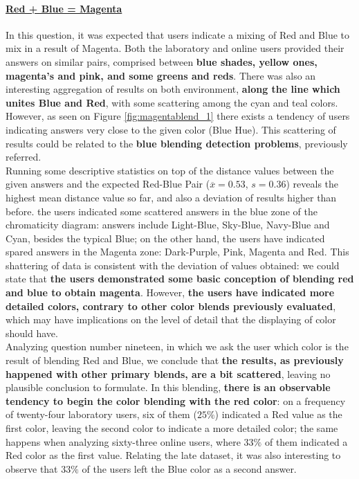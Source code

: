 \paragraph{\ul{Red + Blue = Magenta}}
%
In this question, it was expected that users indicate a mixing of Red and Blue to mix in a result of Magenta. Both the laboratory and online users provided their answers on similar pairs, comprised between \textbf{blue shades, yellow ones, magenta's and
pink, and some greens and reds}. There was also an interesting aggregation of results on both environment, \textbf{along the line which unites Blue and Red}, with some scattering among the cyan and teal colors.  \\
However, as seen on Figure \ref{fig:magentablend_1} there exists a tendency of users indicating answers very close to the given color (Blue Hue). This scattering of results could be related to the \textbf{blue blending
detection problems}, previously referred. \\
%
Running some descriptive statistics on top of the distance values between the given answers and the expected Red-Blue Pair ($\overline{x} = 0.53$, $s = 0.36$) reveals the highest mean distance value so far, and also a deviation of results higher than before.
the users indicated some scattered answers in the blue zone of the chromaticity diagram: answers include Light-Blue, Sky-Blue, Navy-Blue and Cyan, besides the typical Blue; on the other hand, the users have indicated spared answers in the Magenta zone: Dark-Purple,
Pink, Magenta and Red. This shattering of data is consistent with the deviation of values obtained: we could state that \textbf{the users demonstrated some basic conception of blending red and blue to obtain magenta}. However, \textbf{the users have indicated more
detailed colors, contrary to other color blends previously evaluated}, which may have implications on the level of detail that the displaying of color should have. \\
%
Analyzing question number nineteen, in which we ask the user which color is the result of blending Red and Blue, we conclude that \textbf{the results, as previously happened with other primary blends, are a bit scattered}, leaving no plausible conclusion to formulate.
In this blending, \textbf{there is an observable tendency to begin the color blending with the red color}: on a frequency of twenty-four laboratory users, six of them ($25\%$) indicated a Red value as the first color, leaving the second color to indicate a
more detailed color; the same happens when analyzing sixty-three online users, where $33\%$ of them indicated a Red color as the first value. Relating the late dataset, it was also interesting to observe that $33\%$ of the users left the Blue color as a second answer.
